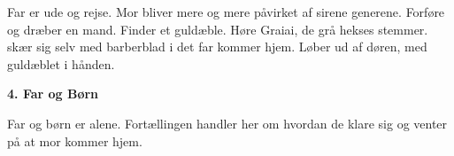 \documentclass[]{article}
\begin{document}
Far er ude og rejse. Mor bliver mere og mere påvirket af sirene generene. Forføre og dræber en mand. Finder et guldæble. Høre Graiai, de grå hekses stemmer. skær sig selv med barberblad i det far kommer hjem. Løber ud af døren, med guldæblet i hånden. 

\begin{center}
	\large\textbf{4. Far og Børn}
\end{center}

Far og børn er alene. Fortællingen handler her om hvordan de klare sig og venter på at mor kommer hjem.
	
\end{document}
